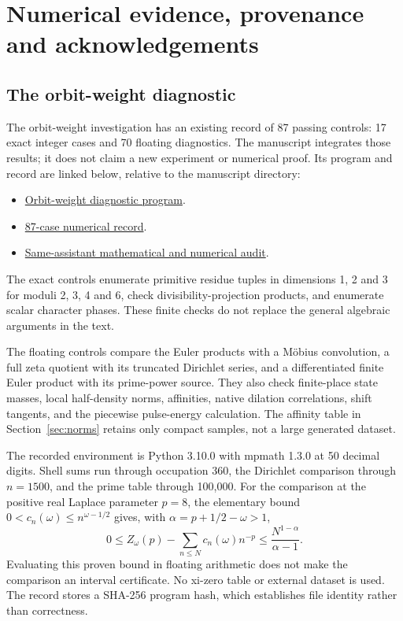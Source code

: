 \section{Numerical evidence, provenance and acknowledgements}
\label{app:validation}

\subsection{The orbit-weight diagnostic}

The orbit-weight investigation has an existing record of 87 passing
controls: 17 exact integer cases and 70 floating diagnostics. The
manuscript integrates those results; it does not claim a new experiment
or numerical proof. Its program and record are linked below, relative
to the manuscript directory:
\begin{itemize}
\item \href{numerics/check_arithmetic_orbit_weights.py}{Orbit-weight diagnostic program}.
\item \href{numerics/records/arithmetic-orbit-weights-20260923.json}{87-case numerical record}.
\item \href{reviews/review_codex_arithmetic_orbit_weights_20260923.md}{Same-assistant mathematical and numerical audit}.
\end{itemize}

The exact controls enumerate primitive residue tuples in dimensions
1, 2 and 3 for moduli 2, 3, 4 and 6, check divisibility-projection
products, and enumerate scalar character phases. These finite checks
do not replace the general algebraic arguments in the text.

The floating controls compare the Euler products with a M\"obius
convolution, a full zeta quotient with its truncated Dirichlet series,
and a differentiated finite Euler product with its prime-power source.
They also check finite-place state masses, local half-density norms,
affinities, native dilation correlations, shift tangents, and the
piecewise pulse-energy calculation. The affinity table in
Section~\ref{sec:norms} retains only compact samples, not a large
generated dataset.

The recorded environment is Python 3.10.0 with mpmath 1.3.0 at
50 decimal digits. Shell sums run through occupation 360, the
Dirichlet comparison through $n=1500$, and the prime table through
100,000. For the comparison at the positive real Laplace parameter
$p=8$, the elementary
bound $0<c_n(\omega)\le n^{\omega-1/2}$ gives, with
$\alpha=p+1/2-\omega>1$,
\begin{equation}
 0\le Z_\omega(p)-\sum_{n\le N}c_n(\omega)n^{-p}
 \le\frac{N^{1-\alpha}}{\alpha-1}.
\end{equation}
Evaluating this proven bound in floating arithmetic does not make the
comparison an interval certificate. No xi-zero table or external
dataset is used. The record stores a SHA-256 program hash, which
establishes file identity rather than correctness.

